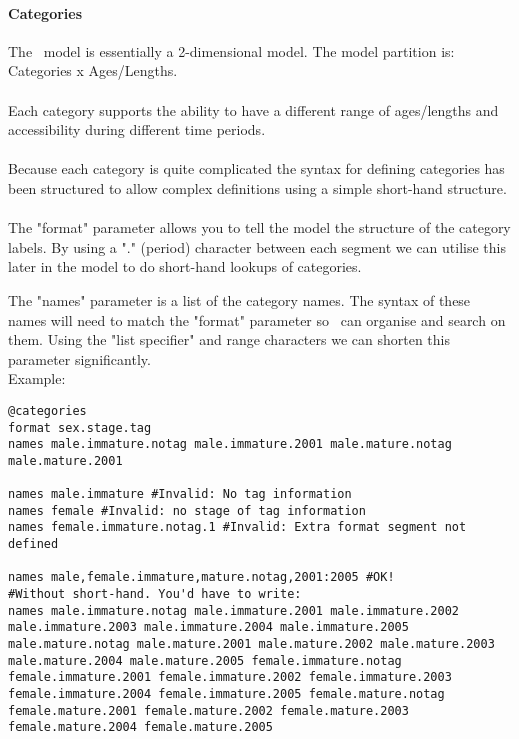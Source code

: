 \paragraph*{Categories}
The \CNAME\ model is essentially a 2-dimensional model. The model partition is:\\
Categories x Ages/Lengths.
\\\\
Each category supports the ability to have a different range of ages/lengths and accessibility during different time periods.
\\\\
Because each category is quite complicated the syntax for defining categories has been structured to allow complex definitions using a simple short-hand structure.
\\\\
The "format" parameter allows you to tell the model the structure of the category labels. By using a "." (period) character between each segment we can utilise this later in the model to do short-hand lookups of categories.

The "names" parameter is a list of the category names. The syntax of these names will need to match the "format" parameter so \CNAME\ can organise and search on them. Using the "list specifier" and range characters we can shorten this parameter significantly.\\
Example:
{\small{\begin{verbatim}
@categories
format sex.stage.tag
names male.immature.notag male.immature.2001 male.mature.notag male.mature.2001

names male.immature #Invalid: No tag information
names female #Invalid: no stage of tag information
names female.immature.notag.1 #Invalid: Extra format segment not defined

names male,female.immature,mature.notag,2001:2005 #OK!
#Without short-hand. You'd have to write:
names male.immature.notag male.immature.2001 male.immature.2002 male.immature.2003 male.immature.2004 male.immature.2005 male.mature.notag male.mature.2001 male.mature.2002 male.mature.2003 male.mature.2004 male.mature.2005 female.immature.notag female.immature.2001 female.immature.2002 female.immature.2003 female.immature.2004 female.immature.2005 female.mature.notag female.mature.2001 female.mature.2002 female.mature.2003 female.mature.2004 female.mature.2005
\end{verbatim}}}

